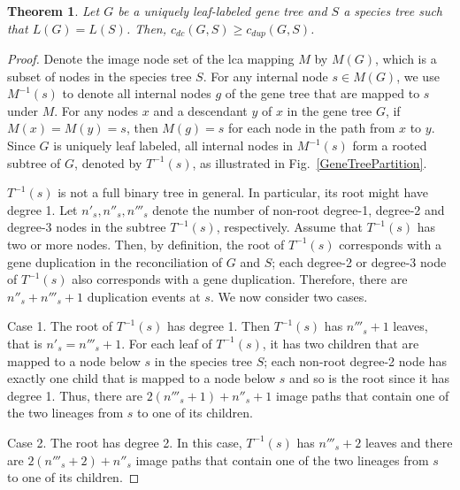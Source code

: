\documentclass[9.5pt,journal,letterpaper,compsoc]{IEEEtran}
\newtheorem{theorem}{\bf Theorem}[section]
\begin{document}
\begin{theorem}
\label{DC_DupLoss_Thm}
 Let $G$ be a uniquely leaf-labeled gene tree
and $S$  a species tree such that $L(G)=L(S)$. Then,
    $c_{dc}(G, S) \geq c_{dup}(G, S)$.
\end{theorem}
\begin{proof}
 Denote the image node set  of the lca  mapping $M$ by $M(G)$, which is a subset
of nodes in the species tree $S$.
For any internal node $s\in M(G)$,
we use $M^{-1}(s)$ to denote all internal nodes $g$ of the gene tree
 that are mapped
to $s$ under $M$. For any nodes $x$ and a  descendant $y$ of $x$ in the gene tree $G$,
 if $M(x)=M(y)=s$, then $M(g)=s$ for each node in the path from $x$ to
$y$.  Since $G$ is uniquely leaf labeled, all internal nodes in
$M^{-1}(s)$ form a rooted subtree of $G$, denoted by $T^{-1}(s)$,
as illustrated in Fig.~\ref{GeneTreePartition}.

$T^{-1}(s)$ is not a full binary tree in general. In particular, its
root might have degree 1. Let $n'_{s}, n''_s, n'''_s$  denote the
number of non-root degree-1, degree-2 and degree-3 nodes in the
subtree $T^{-1}(s)$, respectively. Assume that $T^{-1}(s)$ has  two
or more nodes. Then, by definition,  the root of $T^{-1}(s)$
corresponds with a gene duplication in the reconciliation of $G$ and
$S$;
  each degree-2 or degree-3 node of $T^{-1}(s)$ also corresponds with a
gene duplication. Therefore, there are $n''_s+n'''_s+1$
 duplication events at $s$.  We now consider two cases.

 Case 1. The root of $T^{-1}(s)$ has degree 1.   Then
  $T^{-1}(s)$  has  $n'''_s+1$ leaves, that is $n'_s=n'''_s+1$.
For  each leaf of $T^{-1}(s)$, it has two children that are mapped to
a node  below $s$ in the species tree $S$;
each non-root degree-2 node has exactly one child that is
mapped to a node below $s$ and so is the root since it has degree 1.
Thus,
there are $2\left(n'''_s+1\right) + n''_s + 1$
 image paths that contain  one of  the two lineages from $s$ to one of its children.

Case 2.  The root has degree 2.
 In this case,  $T^{-1}(s)$ has $n'''_s+2$ leaves and
there are $2\left(n'''_s+2\right)+n''_s$ image paths that contain
 one of the two lineages from $s$ to one of  its children.


\end{proof}
\end{document}
